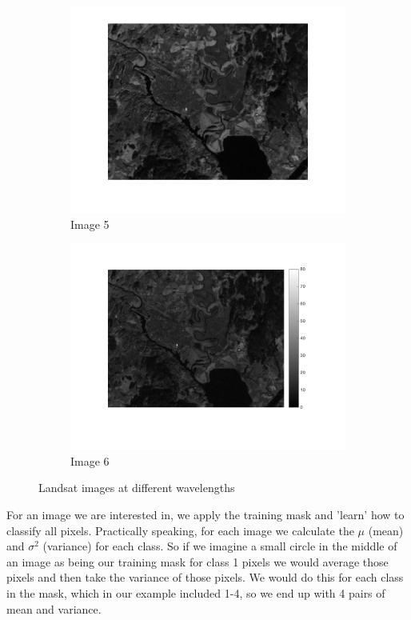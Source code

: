 \documentclass[12pt,a4paper]{report}
\begin{document}
\begin{figure}[!ht]
	\begin{subfigure}{0.5\textwidth}
	\centering
	\includegraphics[width=1.0\textwidth]{Landsat5}	
	\caption*{Image 5}
	\end{subfigure}
	\begin{subfigure}{0.5\textwidth}
	\centering
	\includegraphics[width=1.0\textwidth]{Landsat6}	
	\caption*{Image 6}
	\end{subfigure}
	\caption{Landsat images at different wavelengths}
\end{figure}

For an image we are interested in, we apply the training mask and  'learn' how to classify all pixels. Practically speaking, for each image we calculate the $\mu$ (mean) and $\sigma^2$ (variance) for each class. So if we imagine a small circle in the middle of an image as being our training mask for class 1 pixels we would average those pixels and then take the variance of those pixels. We would do this for each class in the mask, which in our example included 1-4, so we end up with 4 pairs of mean and variance.
\end{document}
